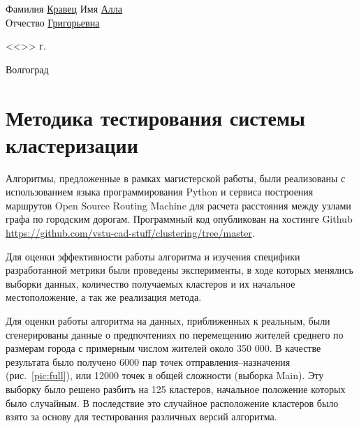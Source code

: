 \documentclass[a4paper, 14pt]{extreport}
\begin{document}
\begin{titlepage}
\begin{flushleft}
            Фамилия \underline{Кравец\hspace{3.3cm}} Имя \underline{Алла\hspace{5.5cm}}\\
            Отчество \underline{Григорьевна\hspace{2.2cm}}
        \end{flushleft}
        \vspace{1.5cm}
        \begin{flushright}
            <<\underline{\hspace{1.0cm}}>>\underline{\hspace{4.0cm}} \the\year г.
        \end{flushright}
        \vspace{\fill}
        \begin{center}
            Волгоград \the\year
        \end{center}
    \end{titlepage}
    \tableofcontents
    \onehalfspacing

    \chapter{Методика тестирования системы кластеризации}
    Алгоритмы, предложенные в рамках магистерской работы, были реализованы с использованием языка программирования Python и сервиса построения маршрутов Open Source Routing Machine для расчета расстояния между узлами графа по городским дорогам. Программный код опубликован на хостинге Github 
    \url{https://github.com/vstu-cad-stuff/clustering/tree/master}.

    Для оценки эффективности работы алгоритма и изучения специфики разработанной метрики были проведены эксперименты, в ходе которых менялись выборки данных, количество получаемых кластеров и их начальное местоположение, а так же реализация метода.

Для оценки работы алгоритма на данных, приближенных к реальным, были сгенерированы данные о предпочтениях по перемещению жителей среднего по размерам города с примерным числом жителей около 350 000. В качестве результата было получено 6000 пар точек отправления--назначения (рис.~\ref{pic:full}), или 12000 точек в общей сложности (выборка Main). Эту выборку было решено разбить на 125 кластеров, начальное положение которых было случайным. В последствие это случайное расположение кластеров было взято за основу для тестирования различных версий алгоритма.
\end{document}

